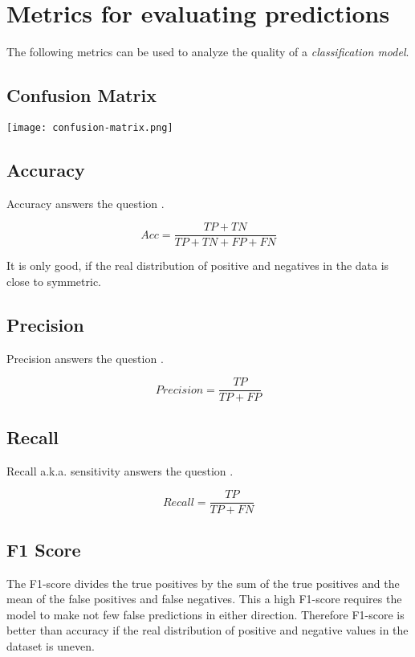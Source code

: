 \section{Metrics for evaluating predictions}

The following metrics can be used to analyze the quality of a \textit{classification model}.

\subsection{Confusion Matrix}

\texttt{[image: confusion-matrix.png]}

\subsection{Accuracy}

Accuracy answers the question .

$$
    Acc = \frac{TP + TN}{TP + TN + FP + FN}
$$

It is only good, if the real distribution of positive and negatives in the data is close to symmetric.

\subsection{Precision}

Precision answers the question .

$$
    Precision = \frac{TP}{TP + FP}
$$

\subsection{Recall}

Recall a.k.a. sensitivity answers the question .

$$
    Recall = \frac{TP}{TP + FN}
$$

\subsection{F1 Score}

The F1-score divides the true positives by the sum of the true positives and the mean of the false positives and false negatives. This a high F1-score requires the model to make not few false predictions in either direction. Therefore F1-score is better than accuracy if the real distribution of positive and negative values in the dataset is uneven.

